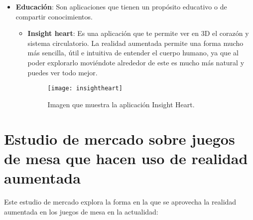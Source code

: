 \begin{itemize}
\begin{itemize}
  \end{itemize}

  \item \textbf{Educación}: Son aplicaciones que tienen un propósito educativo o de compartir conocimientos.

  \begin{itemize}
    \item \textbf{Insight heart}: Es una aplicación que te permite ver en 3D el corazón y sistema circulatorio. La realidad aumentada permite una forma mucho más sencilla, útil e intuitiva de entender el cuerpo humano, ya que al poder explorarlo moviéndote alrededor de este es mucho más natural y puedes ver todo mejor.

    \begin{figure}[h]
      \centering
      \texttt{[image: insightheart]}
      \caption{Imagen que muestra la aplicación Insight Heart.\protect\footnotemark}
      \label{figura-insight-heart}
    \end{figure}

  \end{itemize}
\end{itemize}


\section{Estudio de mercado sobre juegos de mesa que hacen uso de realidad aumentada}

Este estudio de mercado explora la forma en la que se aprovecha la realidad aumentada en los juegos de mesa en la actualidad:

